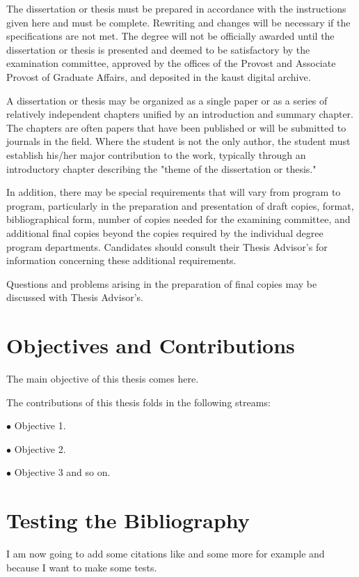 The dissertation or thesis must be prepared in accordance with the instructions given here and must be complete. Rewriting and changes will be necessary if the specifications are not met. The degree will not be officially awarded until the dissertation or thesis is presented and deemed to be satisfactory by the examination committee, approved by the offices of the Provost and Associate Provost of Graduate Affairs, and deposited in the \gls{kaust} digital archive. 
 
A dissertation or thesis may be organized as a single paper or as a series of relatively independent chapters unified by an introduction and summary chapter.  The chapters are often papers that have been published or will be submitted to journals in the field. Where the student is not the only author, the student must establish his/her major contribution to the work, typically through an introductory chapter describing the "theme of the dissertation or thesis." 

In addition, there may be special requirements that will vary from program to program, particularly in the preparation and presentation of draft copies, format, bibliographical form, number of copies needed for the examining committee, and additional final copies beyond the copies required by the individual degree program departments. Candidates should consult their Thesis Advisor's for information concerning these additional requirements.  
 
Questions and problems arising in the preparation of final copies may be discussed with Thesis Advisor's.

\section{Objectives and Contributions}

The main objective of this thesis comes here.

The contributions of this thesis folds in the following streams:

$\bullet$ Objective 1.

$\bullet$ Objective 2.

$\bullet$ Objective 3 and so on.

\section{Testing the Bibliography}
I am now going to add some citations like \cite{key1} and some more for example \cite{key2} and \cite{key3} because I want to make some tests.

